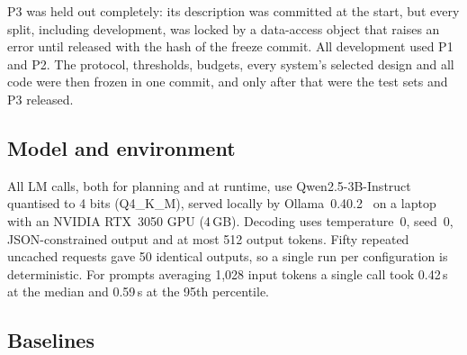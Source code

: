\documentclass[conference]{IEEEtran}
\newcommand{\oos}{\textsc{oos}}
\begin{document}
\begin{table}[t]
\centering
\caption{The three projects built from MASSIVE en-US. Every development set has 80 in-scope and 20 \oos{} utterances.}
\label{tab:projects}
\small
\setlength{\tabcolsep}{4pt}
\end{table}

P3 was held out completely: its description was committed at the start, but every split, including development, was locked by a data-access object that raises an error until released with the hash of the freeze commit. All development used P1 and P2. The protocol, thresholds, budgets, every system's selected design and all code were then frozen in one commit, and only after that were the test sets and P3 released.

\subsection{Model and environment}

All LM calls, both for planning and at runtime, use Qwen2.5-3B-Instruct~\cite{qwen2024qwen25,qwen2024card} quantised to 4 bits (Q4\_K\_M), served locally by Ollama~0.40.2~\cite{ollama2026} on a laptop with an NVIDIA RTX~3050 GPU (4\,GB). Decoding uses temperature~0, seed~0, JSON-constrained output and at most 512 output tokens. Fifty repeated uncached requests gave 50 identical outputs, so a single run per configuration is deterministic. For prompts averaging 1{,}028 input tokens a single call took 0.42\,s at the median and 0.59\,s at the 95th percentile.
\subsection{Baselines}
\end{document}
